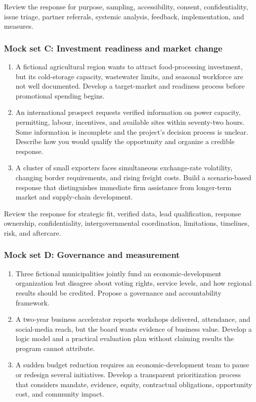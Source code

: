 \documentclass[11pt,letterpaper,oneside,openany]{book}
\begin{document}
Review the response for purpose, sampling, accessibility, consent, confidentiality, issue triage, partner referrals, systemic analysis, feedback, implementation, and measures.


\subsubsection[Mock set C: Investment readiness and market change]{Mock set C: Investment readiness and market change}
\begin{enumerate}
\item A fictional agricultural region wants to attract food-processing investment, but its cold-storage capacity, wastewater limits, and seasonal workforce are not well documented. Develop a target-market and readiness process before promotional spending begins.
\item An international prospect requests verified information on power capacity, permitting, labour, incentives, and available sites within seventy-two hours. Some information is incomplete and the project's decision process is unclear. Describe how you would qualify the opportunity and organize a credible response.
\item A cluster of small exporters faces simultaneous exchange-rate volatility, changing border requirements, and rising freight costs. Build a scenario-based response that distinguishes immediate firm assistance from longer-term market and supply-chain development.
\end{enumerate}


Review the response for strategic fit, verified data, lead qualification, response ownership, confidentiality, intergovernmental coordination, limitations, timelines, risk, and aftercare.


\subsubsection[Mock set D: Governance and measurement]{Mock set D: Governance and measurement}
\begin{enumerate}
\item Three fictional municipalities jointly fund an economic-development organization but disagree about voting rights, service levels, and how regional results should be credited. Propose a governance and accountability framework.
\item A two-year business accelerator reports workshops delivered, attendance, and social-media reach, but the board wants evidence of business value. Develop a logic model and a practical evaluation plan without claiming results the program cannot attribute.
\item A sudden budget reduction requires an economic-development team to pause or redesign several initiatives. Develop a transparent prioritization process that considers mandate, evidence, equity, contractual obligations, opportunity cost, and community impact.
\end{enumerate}
\end{document}
